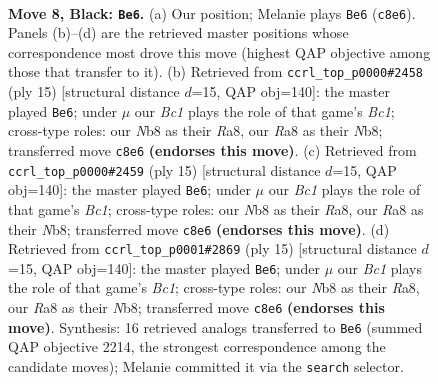 \documentclass[11pt]{article}
\begin{document}
\begin{figure}[p]\centering
\begin{subfigure}{0.46\textwidth}\centering
\resizebox{\linewidth}{!}{%
\newchessgame
\chessboard[
  setfen={rnbqk2r/1p2bppp/p2p1n2/4p3/4P3/2N2N2/PPP1BPPP/R1BQ1RK1 b kq - 3 8},
  showmover=false,
  pgfstyle=straightmove, color=movearrow, markmove={c8-e6}
]}
\caption{}
\end{subfigure}\hfill
\begin{subfigure}{0.46\textwidth}\centering
\resizebox{\linewidth}{!}{%
\newchessgame
\chessboard[
  setfen={rnbqkb1r/1p3pp1/p2p1n1p/4p3/4P3/2N2N2/PPP1BPPP/R1BQ1RK1 b kq - 1 8},
  showmover=false,
  pgfstyle=straightmove, color=movearrow, markmove={c8-e6}
]}
\caption{}
\end{subfigure}
\\[4pt]
\begin{subfigure}{0.46\textwidth}\centering
\resizebox{\linewidth}{!}{%
\newchessgame
\chessboard[
  setfen={rnbqkb1r/1p3pp1/p2p1n1p/4p3/4P3/2N2N2/PPP1BPPP/R1BQ1RK1 b kq - 1 8},
  showmover=false,
  pgfstyle=straightmove, color=movearrow, markmove={c8-e6}
]}
\caption{}
\end{subfigure}\hfill
\begin{subfigure}{0.46\textwidth}\centering
\resizebox{\linewidth}{!}{%
\newchessgame
\chessboard[
  setfen={rnbqkb1r/1p3pp1/p2p1n1p/4p3/4P3/2N2N2/PPP1BPPP/R1BQ1RK1 b kq - 1 8},
  showmover=false,
  pgfstyle=straightmove, color=movearrow, markmove={c8-e6}
]}
\caption{}
\end{subfigure}
\caption{\textbf{Move 8, Black: \texttt{Be6}.} (a) Our position; Melanie plays \texttt{Be6} (\texttt{c8e6}). Panels (b)--(d) are the retrieved master positions whose correspondence most drove this move (highest QAP objective among those that transfer to it). (b) Retrieved from \texttt{ccrl\_top\_p0000\#2458} (ply 15) [structural distance $d$=15, QAP obj=140]: the master played \texttt{Be6}; under $\mu$ our \emph{Bc1} plays the role of that game's \emph{Bc1}; cross-type roles: our \emph{N}b8 as their \emph{R}a8, our \emph{R}a8 as their \emph{N}b8; transferred move \texttt{c8e6} \textbf{(endorses this move)}. (c) Retrieved from \texttt{ccrl\_top\_p0000\#2459} (ply 15) [structural distance $d$=15, QAP obj=140]: the master played \texttt{Be6}; under $\mu$ our \emph{Bc1} plays the role of that game's \emph{Bc1}; cross-type roles: our \emph{N}b8 as their \emph{R}a8, our \emph{R}a8 as their \emph{N}b8; transferred move \texttt{c8e6} \textbf{(endorses this move)}. (d) Retrieved from \texttt{ccrl\_top\_p0001\#2869} (ply 15) [structural distance $d$=15, QAP obj=140]: the master played \texttt{Be6}; under $\mu$ our \emph{Bc1} plays the role of that game's \emph{Bc1}; cross-type roles: our \emph{N}b8 as their \emph{R}a8, our \emph{R}a8 as their \emph{N}b8; transferred move \texttt{c8e6} \textbf{(endorses this move)}. Synthesis: 16 retrieved analogs transferred to \texttt{Be6} (summed QAP objective 2214, the strongest correspondence among the candidate moves); Melanie committed it via the \texttt{search} selector.}
\label{fig:thought-m15}
\end{figure}
\end{document}
